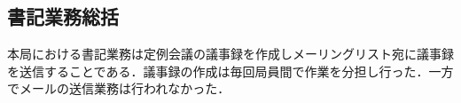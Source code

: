 \subsection*{書記業務総括}


本局における書記業務は定例会議の議事録を作成しメーリングリスト宛に議事録を送信することである．議事録の作成は毎回局員間で作業を分担し行った．一方でメールの送信業務は行われなかった．
